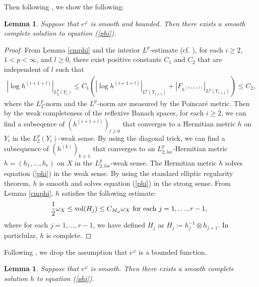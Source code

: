 \documentclass[12pt]{article}
\theoremstyle{definition}
\newtheorem{lemm}[defi]{Lemma}
\def\vol{{\rm vol}}
\begin{document}
Then following \cite[Proposition 5.6]{LM1}, we show the following:
\begin{lemm}\label{sandb}{\it Suppose that $e^\varphi$ is smooth and bounded. Then there exists a smooth complete solution to equation (\ref{phi}).
}
\end{lemm}
\begin{proof} 
From Lemma \ref{cmphi} and the interior $L^p$-estimate (cf. \cite[Theorem 9.11]{GT1}), for each $i\geq 2$, $1<p<\infty$, and $l\geq 0$, there exist positive constants $C_1$ and $C_2$ that are independent of $l$ such that
\begin{align*}
|\log h^{(i+1+l)}|_{L^p_2(Y_i)}\leq C_1(|\log h^{(i+1+l)}|_{L^p(Y_{i+1})}+|F_{h^{(i+1+l)}}|_{L^p(Y_{i+1})})\leq C_2,
\end{align*}
where the $L^p_2$-norm and the $L^p$-norm are measured by the Poincar\'e metric. Then by the weak completeness of the reflexive Banach spaces, for each $i\geq 2$, we can find a subseqence of $(h^{(i+1+l)})_{l\geq 0}$ that converges to a Hermitian metric $h$ on $Y_i$ in the $L^p_2(Y_i)$-weak sense. By using the diagonal trick, we can find a subsequence of $(h^{(k)})_{k\geq 1}$ that converges to an $L^p_{2,loc}$-Hermitian metric $h=(h_1,\dots, h_r)$ on $X$ in the $L^p_{2,loc}$-weak sense. The Hermitian metric $h$ solves equation (\ref{phi}) in the weak sense. By using the standard elliptic regularity theorem, $h$ is smooth and solves equation (\ref{phi}) in the strong sense. From Lemma \ref{cmphi}, $h$ satisfies the following estimate:
\begin{align}
\frac{1}{2}\omega_X \leq \vol(H_j) \leq C_{M_\varphi} \omega_X \ \text{for each $j=1,\dots, r-1$}, \label{1/2omega}
\end{align}
where for each $j=1,\dots, r-1$, we have defined $H_j$ as $H_j\coloneqq h_j^{-1}\otimes h_{j+1}$. In particlular, $h$ is complete. 
\end{proof}
Following \cite[Proposition 5.7 and Proposition 5.8]{LM1}, we drop the assumption that $e^\varphi$ is a bounded function.
\begin{lemm}\label{unbounded}{\it Suppose that $e^\varphi$ is smooth. Then there exists a smooth complete solution $h$ to equation (\ref{phi}).
}
\end{lemm}
\end{document}
